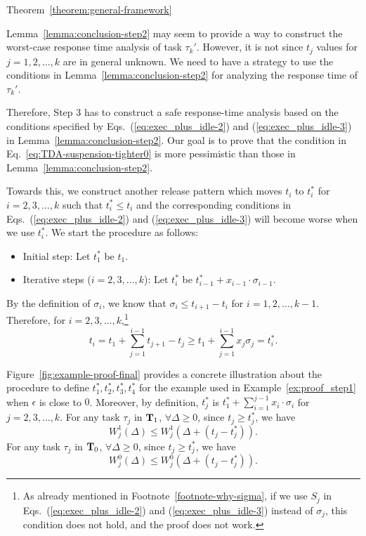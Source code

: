 \begin{appProof}{Theorem~\ref{theorem:general-framework}}


Lemma~\ref{lemma:conclusion-step2} may seem to provide a way to
construct the worst-case response time analysis of task
$\tau_k'$. However, it is not since $t_j$ values for $j=1,2,\ldots,k$
are in general unknown. We need to have a strategy to use the
conditions in Lemma~\ref{lemma:conclusion-step2} for analyzing the
response time of $\tau_k'$.

Therefore, Step 3 has to construct a safe response-time analysis based on the
conditions specified by Eqs.~(\ref{eq:exec_plus_idle-2}) and
(\ref{eq:exec_plus_idle-3}) in Lemma~\ref{lemma:conclusion-step2}. Our
goal is to prove that the condition in
Eq.~\eqref{eq:TDA-suspension-tighter0} is more pessimistic than those
in Lemma~\ref{lemma:conclusion-step2}.

Towards this, we construct another release pattern
which moves $t_i$ to $t_i^*$ for $i=2,3,\ldots,k$ such that $t_i^*
\leq t_i$ and the corresponding conditions in Eqs.~(\ref{eq:exec_plus_idle-2}) and
(\ref{eq:exec_plus_idle-3}) will become worse when we use $t_i^*$. We start
the procedure as follows:
\begin{itemize}
\item Initial step: Let $t_1^*$ be $t_1$.
\item Iterative steps ($i=2,3,\ldots,k$): Let $t_i^*$ be $t_{i-1}^*+x_{i-1}\cdot\sigma_{i-1}$.
\end{itemize}
By the definition of $\sigma_i$, we know that $\sigma_i \leq t_{i+1}-t_i$ for $i=1,2,\ldots,k-1$.
Therefore,  for $i=2,3,\ldots,k$,\footnote{As already mentioned in Footnote~\ref{footnote-why-sigma}, if we use $S_j$ in Eqs.~(\ref{eq:exec_plus_idle-2}) and
(\ref{eq:exec_plus_idle-3}) instead of $\sigma_j$, this condition does not hold, and the proof does not work.}
\begin{equation*}
  t_i = t_1 + \sum_{j=1}^{i-1} t_{j+1} - t_j \geq t_1 + \sum_{j=1}^{i-1} x_j \sigma_j = t_i^*.
\end{equation*}

Figure~\ref{fig:example-proof-final} provides a concrete illustration about the procedure to define $t_1^*, t_2^*, t_3^*, t_4^*$ for the example used in Example~\ref{ex:proof_step1} when $\epsilon$ is close to $0$.
 Moreover, by
definition, $t_j^*$ is $t_1^* + \sum_{i=1}^{j-1} x_i\cdot\sigma_i$ for
$j=2,3,\ldots,k$.
For any task $\tau_j$ in ${\bf T}_1$,  $\forall \Delta \geq 0$, since $t_j \geq t_j^*$, we have
\begin{equation}
  \label{eq:execution-case1-shifted}
  W_j^1(\Delta)  \leq W_j^1(\Delta + (t_j-t_j^*)).
\end{equation}
For any task $\tau_j$ in ${\bf T}_0$,  $\forall \Delta \geq 0$, since $t_j \geq t_j^*$, we have
\begin{equation}
  \label{eq:execution-case2-shifted}
  W_j^0(\Delta)  \leq W_j^0(\Delta + (t_j-t_j^*)).
\end{equation}


\end{appProof}
